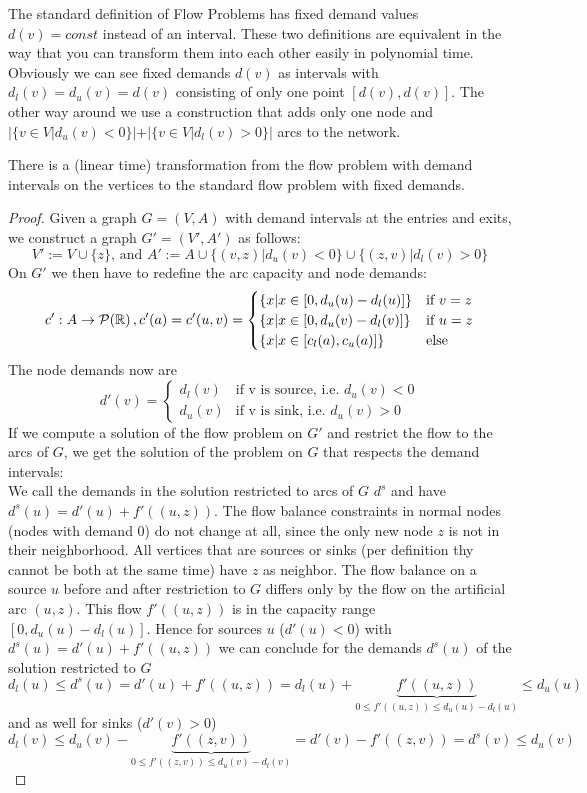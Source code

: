 The standard definition of Flow Problems has fixed demand values $d(v)=const$ instead of an interval. These two 
definitions are equivalent in the way that you can transform them into each other easily in polynomial time. Obviously 
we can see fixed demands $d(v)$ as intervals with $d_l(v)=d_u(v)=d(v)$ consisting of only one point $[d(v), d(v)]$. The 
other way around we use a construction that adds only one node and $|\{v\in V| d_u(v)<0\}|+|\{v\in V| d_l(v)>0\}|$ arcs 
to the network.
\begin{prop}
 There is a (linear time) transformation from the flow problem with demand intervals on the vertices to the standard 
flow problem with fixed demands. 
\end{prop}
\begin{proof}
 Given a graph $G=(V,A)$ with demand intervals at the entries and exits, we construct a graph $G'=(V',A')$ as follows:
 $$V' := V\cup \{z\} \textrm{, and } A' := A\cup \{ (v,z)| d_u(v)<0 \}\cup\{ (z,v)|d_l(v)>0\}$$ On $G'$ we then have 
to redefine the arc capacity and node demands: 
$$c':A\to \mathcal{P}(\mathbb{R})  \,, c'(a)= c'(u,v) = \begin{cases} \{x|x\in [0,d_u(u)-d_l(u)]\} &\textrm{if }v=z\\ 
\{x|x\in [0,d_u(v)-d_l(v)]\}&\textrm{if }u=z\\ \{x|x\in[c_l(a), c_u(a)]\} &\textrm{else } \end{cases}
$$ 
The node demands now are 
$$ d'(v)=\begin{cases} d_l(v) & \textrm{if v is source, i.e. }d_u(v)<0\\
         d_u(v) &\textrm{if v is sink, i.e. }d_u(v)>0
        \end{cases}
$$
If we compute a solution of the flow problem on $G'$ and restrict the flow to the arcs of $G$, we get the solution of 
the problem on $G$ that respects the demand intervals:\\ 
We call the demands in the solution restricted to arcs of $G$ $d^s$ and have $ d^s(u)=d'(u)+f'((u,z))$. The flow balance 
constraints in normal nodes 
(nodes with demand 0) do not change at all, since the only new node $z$ is not in their neighborhood. All vertices that 
are sources or sinks (per definition thy cannot be both at the same time) have $z$ as neighbor. The flow balance on a 
source $u$ before and after restriction to $G$ differs only by the flow on the artificial arc $(u,z)$. This flow 
$f'((u,z))$ is in the capacity range $[0,d_u(u)-d_l(u)]$. Hence for sources $u$ ($d'(u)<0$) with 
$d^s(u)=d'(u)+f'((u,z))$ we can conclude for the demands $d^s(u)$ of the solution restricted to $G$ 
$$d_l(u)\le d^s(u)=d'(u)+f'((u,z))=d_l(u)+\underbrace{f'((u,z))}_{0\le f'((u,z))\le d_u(u)-d_l(u)} \le d_u(u)$$
and as well for sinks ($d'(v)>0$)
$$d_l(v)\le d_u(v)-\underbrace{f'((z,v))}_{0\le f'((z,v))\le d_u(v)-d_l(v)}=d'(v)-f'((z,v))=d^s(v) \le d_u(v)$$
\end{proof}




